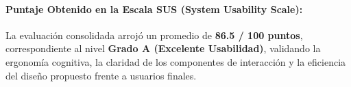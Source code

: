 \paragraph{Puntaje Obtenido en la Escala SUS (System Usability Scale):}
La evaluación consolidada arrojó un promedio de \textbf{86.5 / 100 puntos}, correspondiente al nivel \textbf{Grado A (Excelente Usabilidad)}, validando la ergonomía cognitiva, la claridad de los componentes de interacción y la eficiencia del diseño propuesto frente a usuarios finales.
